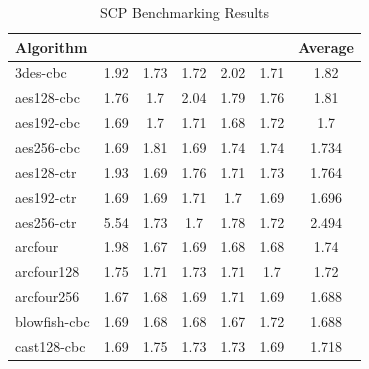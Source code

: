 \documentclass[10pt,conference]{IEEEtran}
\begin{document}
\begin{table}[]
\centering
\caption{SCP Benchmarking Results}
\label{table:resultsScp}
\begin{tabular}{|l|c|c|c|c|c|c|}
\hline
Algorithm    &      &      &      &      &      & Average \\ \hline
3des-cbc     & 1.92 & 1.73 & 1.72 & 2.02 & 1.71 & 1.82    \\ \hline
aes128-cbc   & 1.76 & 1.7  & 2.04 & 1.79 & 1.76 & 1.81    \\ \hline
aes192-cbc   & 1.69 & 1.7  & 1.71 & 1.68 & 1.72 & 1.7     \\ \hline
aes256-cbc   & 1.69 & 1.81 & 1.69 & 1.74 & 1.74 & 1.734   \\ \hline
aes128-ctr   & 1.93 & 1.69 & 1.76 & 1.71 & 1.73 & 1.764   \\ \hline
aes192-ctr   & 1.69 & 1.69 & 1.71 & 1.7  & 1.69 & 1.696   \\ \hline
aes256-ctr   & 5.54 & 1.73 & 1.7  & 1.78 & 1.72 & 2.494   \\ \hline
arcfour      & 1.98 & 1.67 & 1.69 & 1.68 & 1.68 & 1.74    \\ \hline
arcfour128   & 1.75 & 1.71 & 1.73 & 1.71 & 1.7  & 1.72    \\ \hline
arcfour256   & 1.67 & 1.68 & 1.69 & 1.71 & 1.69 & 1.688   \\ \hline
blowfish-cbc & 1.69 & 1.68 & 1.68 & 1.67 & 1.72 & 1.688   \\ \hline
cast128-cbc  & 1.69 & 1.75 & 1.73 & 1.73 & 1.69 & 1.718   \\ \hline
\end{tabular}
\end{table}
\end{document}
